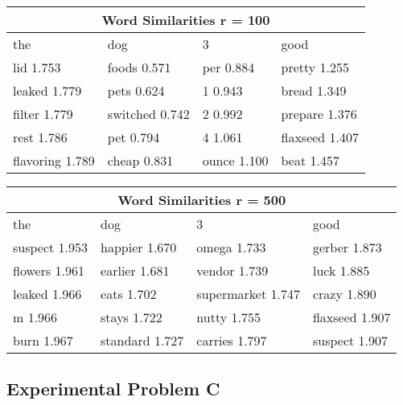 \begin{center}

    \begin{tabular}{ |p{3cm}|p{3cm}|p{3cm}|p{3cm}|  }

        \hline
        \multicolumn{4}{|c|}{Word Similarities r = 100}                 \\
        \hline
        the             & dog            & 3           & good           \\
        \hline
        lid 1.753       & foods 0.571    & per 0.884   & pretty 1.255   \\
        leaked 1.779    & pets 0.624     & 1 0.943     & bread 1.349    \\
        filter 1.779    & switched 0.742 & 2 0.992     & prepare 1.376  \\
        rest 1.786      & pet 0.794      & 4 1.061     & flaxseed 1.407 \\
        flavoring 1.789 & cheap 0.831    & ounce 1.100 & beat 1.457     \\
        \hline
    \end{tabular}
\end{center}

\begin{center}
    \begin{tabular}{ |p{3cm}|p{3cm}|p{4cm}|p{3cm}|  }
        \hline
        \multicolumn{4}{|c|}{Word Similarities r = 500}                     \\
        \hline
        the           & dog            & 3                 & good           \\
        \hline
        suspect 1.953 & happier 1.670  & omega 1.733       & gerber 1.873   \\
        flowers 1.961 & earlier 1.681  & vendor 1.739      & luck 1.885     \\
        leaked 1.966  & eats 1.702     & supermarket 1.747 & crazy 1.890    \\
        m 1.966       & stays 1.722    & nutty 1.755       & flaxseed 1.907 \\
        burn 1.967    & standard 1.727 & carries 1.797     & suspect 1.907  \\
        \hline
    \end{tabular}
\end{center}

\subsection*{Experimental Problem C}

